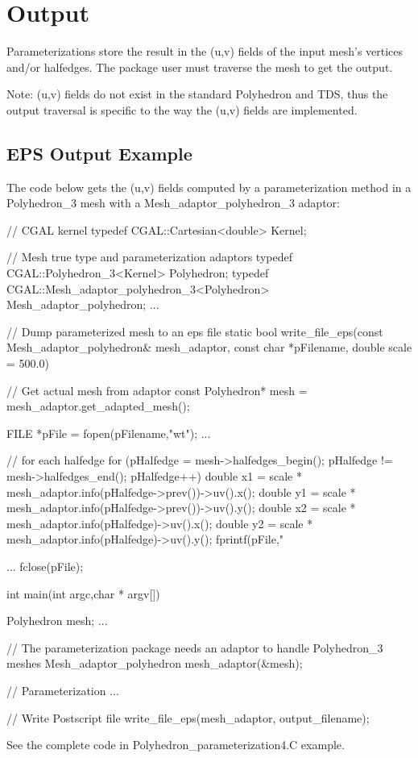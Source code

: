 \section{Output}

Parameterizations store the result in the (u,v) fields of the input mesh's vertices
and/or halfedges. The package user must traverse the mesh to get the output.

Note: (u,v) fields do not exist in the standard Polyhedron and TDS, thus
the output traversal is specific to the way the (u,v) fields are implemented.

\subsection{EPS Output Example}

The code below gets the (u,v) fields computed by a parameterization method
in a Polyhedron\_3 mesh with a Mesh\_adaptor\_polyhedron\_3 adaptor:

\begin{ccExampleCode}

// CGAL kernel
typedef CGAL::Cartesian<double>                         Kernel;

// Mesh true type and parameterization adaptors
typedef CGAL::Polyhedron_3<Kernel>                      Polyhedron;
typedef CGAL::Mesh_adaptor_polyhedron_3<Polyhedron>     Mesh_adaptor_polyhedron;
...

// Dump parameterized mesh to an eps file
static bool write_file_eps(const Mesh_adaptor_polyhedron& mesh_adaptor,
                           const char *pFilename,
                           double scale = 500.0)
{
    // Get actual mesh from adaptor
    const Polyhedron* mesh = mesh_adaptor.get_adapted_mesh();

    FILE *pFile = fopen(pFilename,"wt");
    ...

    // for each halfedge
    for (pHalfedge = mesh->halfedges_begin();
         pHalfedge != mesh->halfedges_end();
         pHalfedge++)
    {
        double x1 = scale * mesh_adaptor.info(pHalfedge->prev())->uv().x();
        double y1 = scale * mesh_adaptor.info(pHalfedge->prev())->uv().y();
        double x2 = scale * mesh_adaptor.info(pHalfedge)->uv().x();
        double y2 = scale * mesh_adaptor.info(pHalfedge)->uv().y();
        fprintf(pFile,"%
    }

    ...
    fclose(pFile);
}

int main(int argc,char * argv[])
{
    Polyhedron mesh;
    ...

    // The parameterization package needs an adaptor to handle Polyhedron_3 meshes
    Mesh_adaptor_polyhedron mesh_adaptor(&mesh);

    // Parameterization
    ...

    // Write Postscript file
    write_file_eps(mesh_adaptor, output_filename);
}

\end{ccExampleCode}

See the complete code in Polyhedron\_parameterization4.C example.